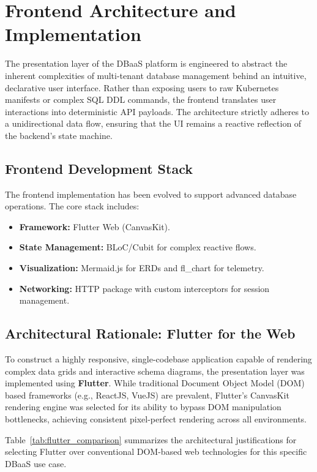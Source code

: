 \section{Frontend Architecture and Implementation}

The presentation layer of the DBaaS platform is engineered to abstract the inherent complexities of multi-tenant database management behind an intuitive, declarative user interface. Rather than exposing users to raw Kubernetes manifests or complex SQL DDL commands, the frontend translates user interactions into deterministic API payloads. The architecture strictly adheres to a unidirectional data flow, ensuring that the UI remains a reactive reflection of the backend's state machine.
\subsection{Frontend Development Stack}
The frontend implementation has been evolved to support advanced database operations. The core stack includes:
\begin{itemize}
    \item \textbf{Framework:} Flutter Web (CanvasKit).
    \item \textbf{State Management:} BLoC/Cubit for complex reactive flows.
    \item \textbf{Visualization:} Mermaid.js for ERDs and fl\_chart for telemetry.
    \item \textbf{Networking:} HTTP package with custom interceptors for session management.
\end{itemize}
\subsection{Architectural Rationale: Flutter for the Web}

To construct a highly responsive, single-codebase application capable of rendering complex data grids and interactive schema diagrams, the presentation layer was implemented using \textbf{Flutter}. While traditional Document Object Model (DOM) based frameworks (e.g., ReactJS, VueJS) are prevalent, Flutter's CanvasKit rendering engine was selected for its ability to bypass DOM manipulation bottlenecks, achieving consistent pixel-perfect rendering across all environments.

Table~\ref{tab:flutter_comparison} summarizes the architectural justifications for selecting Flutter over conventional DOM-based web technologies for this specific DBaaS use case.


